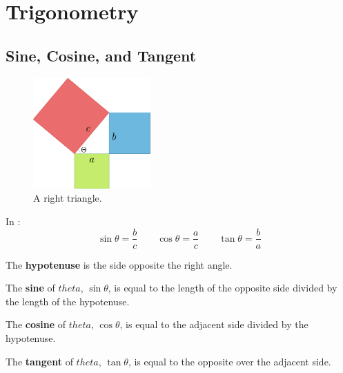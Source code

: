 \chapter{Trigonometry}

\section{Sine, Cosine, and Tangent}
\begin{figure}[H]
  \begin{center}
    \includegraphics[width=0.4\textwidth]{continuous/trig/basictrig}
  \end{center}
  \caption{A right triangle.}
  \label{fig:right_triangle}
\end{figure}

In :
  \[\displaystyle{\sin\theta=\frac{b}{c}}\qquad
  \displaystyle{\cos\theta=\frac{a}{c}}\qquad
  \displaystyle{\tan\theta=\frac{b}{a}}\]

\begin{defn}
    The \textbf{hypotenuse} is the side opposite the right angle.
\end{defn}
\begin{defn}
    The \textbf{sine} of $theta$, $\sin\theta$, is equal to the length of the opposite side divided by the length of the hypotenuse.
\end{defn}
\begin{defn}
    The \textbf{cosine} of $theta$, $\cos\theta$, is equal to the adjacent side divided by the hypotenuse.
\end{defn}
\begin{defn}
    The \textbf{tangent} of $theta$, $\tan\theta$, is equal to the opposite over the adjacent side.
\end{defn}



